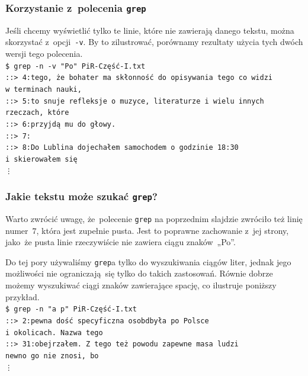 \documentclass[10pt,t]{beamer}
\begin{document}
\begin{frame}
  \frametitle{Korzystanie z~polecenia \texttt{grep}}


  Jeśli chcemy wyświetlić tylko te linie, które \alert{nie} zawierają
  danego tekstu, można skorzystać z~opcji~\texttt{-v}. By to zilustrować,
  porównamy rezultaty użycia tych dwóch wersji tego polecenia. \\
  \texttt{\$ grep -n -v "Po"{} PiR-Część-I.txt} \\
  \texttt{::> 4:tego, że bohater ma skłonność do opisywania tego co widzi
    w~terminach nauki,} \\
  \texttt{::> 5:to snuje refleksje o muzyce, literaturze i~wielu innych
    rzeczach, które} \\
  \texttt{::> 6:przyjdą mu do głowy.} \\
  \texttt{::> 7:} \\
  \texttt{::> 8:Do Lublina dojechałem samochodem o~godzinie 18:30} \\
  \texttt{i~skierowałem~się} \\
  \hspace{2em} \texttt{\vdots}

\end{frame}





\begin{frame}
  \frametitle{Jakie tekstu może szukać \texttt{grep}?}


  Warto zwrócić uwagę, że~polecenie \texttt{grep} na poprzednim slajdzie
  zwróciło też linię numer~$7$, która jest zupełnie pusta. Jest to poprawne
  zachowanie z~jej strony, jako~że pusta linie rzeczywiście nie zawiera
  ciągu znaków~„Po”.

  Do tej pory używaliśmy \texttt{grep}a tylko do wyszukiwania ciągów
  liter, jednak jego możliwości nie ograniczają~się tylko do takich
  zastosowań. Równie dobrze możemy wyszukiwać ciągi znaków
  zawierające spację, co ilustruje poniższy przykład. \\
  \texttt{\$ grep -n "a p"{} PiR-Część-I.txt} \\
  \texttt{::> 2:pewna dość specyficzna osobdbyła
    po~Polsce} \\
  \texttt{i~okolicach. Nazwa tego} \\
  \texttt{::> 31:obejrzałem. Z~tego też powodu zapewne masa ludzi} \\
  \texttt{newno go nie znosi, bo} \\
  \hspace{2em} \texttt{\vdots}

\end{frame}
\end{document}
